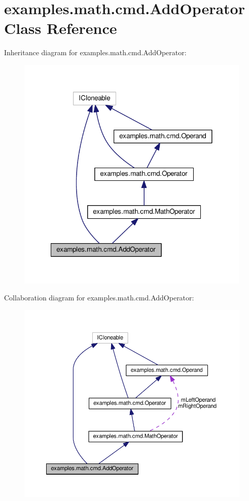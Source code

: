 \hypertarget{classexamples_1_1math_1_1cmd_1_1_add_operator}{\section{examples.\-math.\-cmd.\-Add\-Operator Class Reference}
\label{classexamples_1_1math_1_1cmd_1_1_add_operator}
}


Inheritance diagram for examples.\-math.\-cmd.\-Add\-Operator\-:
\nopagebreak
\begin{figure}[H]
\begin{center}
\leavevmode
\includegraphics[width=317pt]{classexamples_1_1math_1_1cmd_1_1_add_operator__inherit__graph}
\end{center}
\end{figure}


Collaboration diagram for examples.\-math.\-cmd.\-Add\-Operator\-:
\nopagebreak
\begin{figure}[H]
\begin{center}
\leavevmode
\includegraphics[width=350pt]{classexamples_1_1math_1_1cmd_1_1_add_operator__coll__graph}
\end{center}
\end{figure}
